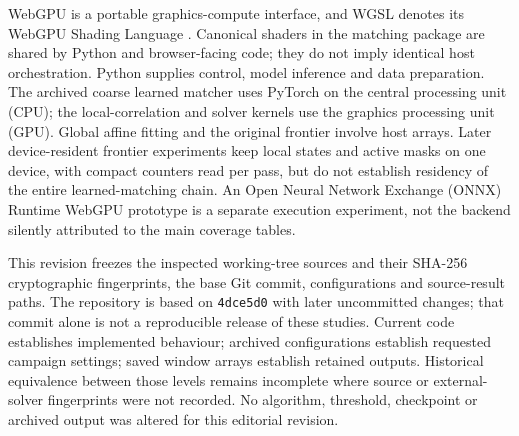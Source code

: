 WebGPU is a portable graphics-compute interface, and WGSL denotes its WebGPU Shading Language \citep{webgpu,wgsl}. Canonical shaders in the matching package are shared by Python and browser-facing code; they do not imply identical host orchestration. Python supplies control, model inference and data preparation. The archived coarse learned matcher uses PyTorch on the central processing unit (CPU); the local-correlation and solver kernels use the graphics processing unit (GPU). Global affine fitting and the original frontier involve host arrays. Later device-resident frontier experiments keep local states and active masks on one device, with compact counters read per pass, but do not establish residency of the entire learned-matching chain. An Open Neural Network Exchange (ONNX) Runtime WebGPU prototype is a separate execution experiment, not the backend silently attributed to the main coverage tables.

This revision freezes the inspected working-tree sources and their SHA-256 cryptographic fingerprints, the base Git commit, configurations and source-result paths. The repository is based on \texttt{4dce5d0} with later uncommitted changes; that commit alone is not a reproducible release of these studies. Current code establishes implemented behaviour; archived configurations establish requested campaign settings; saved window arrays establish retained outputs. Historical equivalence between those levels remains incomplete where source or external-solver fingerprints were not recorded. No algorithm, threshold, checkpoint or archived output was altered for this editorial revision.
